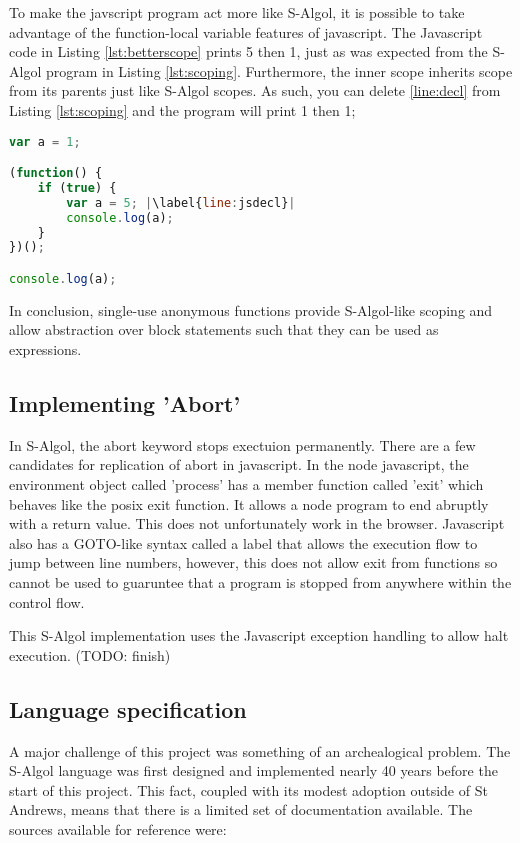 \documentclass{article}
\begin{document}
To make the javscript program act more like S-Algol, it is possible to take advantage of the function-local variable features of javascript. The Javascript code in Listing \ref{lst:betterscope} prints 5 then 1, just as was expected from the S-Algol program in Listing \ref{lst:scoping}. Furthermore, the inner scope inherits scope from its parents just like S-Algol scopes. As such, you can delete \ref{line:decl} from Listing \ref{lst:scoping} and the program will print 1 then 1;

\begin{lstlisting}[caption={S-Algol-like Javascript scoping},label={lst:betterscope}, language=javascript, escapechar="|"]
var a = 1;

(function() {
	if (true) {
		var a = 5; |\label{line:jsdecl}|
		console.log(a);
	}
})();

console.log(a);
\end{lstlisting}

In conclusion, single-use anonymous functions provide S-Algol-like scoping and allow abstraction over block statements such that they can be used as expressions.

\subsection{Implementing 'Abort'}

In S-Algol, the abort keyword stops exectuion permanently. There are a few candidates for replication of abort in javascript. In the node javascript, the environment object called 'process' has a member function called 'exit' which behaves like the posix exit function. It allows a node program to end abruptly with a return value. This does not unfortunately work in the browser. Javascript also has a GOTO-like syntax called a label that allows the execution flow to jump between line numbers, however, this does not allow exit from functions so cannot be used to guaruntee that a program is stopped from anywhere within the control flow.

This S-Algol implementation uses the Javascript exception handling to allow halt execution. (TODO: finish)

\subsection{Language specification}

A major challenge of this project was something of an archealogical problem. The S-Algol language was first designed and implemented nearly 40 years before the start of this project. This fact, coupled with its modest adoption outside of St Andrews, means that there is a limited set of documentation available. The sources available for reference were:
\end{document}

